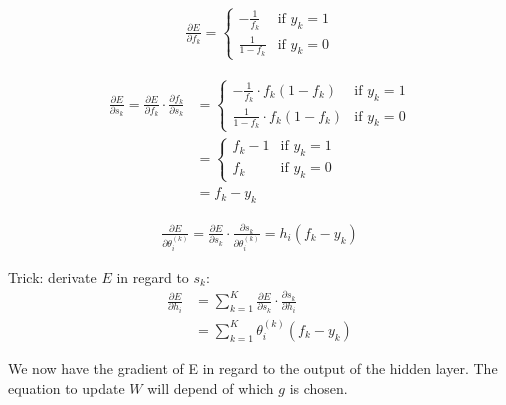 \begin{align}
	\frac{ \partial E } { \partial f_k } = 
		\left\{
		    \begin{array}{ll}
		        - \frac{1}{f_k} & \mbox{if } y_k =1 \\
		        \frac{1}{1 - f_k} & \mbox{if } y_k =0
		    \end{array}
		\right.
\end{align}


\begin{align}
	\frac{ \partial E } { \partial s_k } 
		=  
		\frac{ \partial E } { \partial f_k } \cdot \frac{ \partial f_k } { \partial s_k } 
		&=
		\left\{
		    \begin{array}{ll}
		        - \frac{1}{f_k} \cdot f_k (1 - f_k)& \mbox{if } y_k =1 \\
		        \frac{1}{1 - f_k} \cdot f_k (1 - f_k)& \mbox{if } y_k =0
		    \end{array}
		\right. \\
		&=
		\left\{
		    \begin{array}{ll}
		       f_k - 1 & \mbox{if } y_k =1 \\
		       f_k & \mbox{if } y_k =0
		    \end{array}
		\right. \\
		&= f_k - y_k
\end{align}



\begin{align}
	\frac{\partial E}{\partial \theta_i^{(k)}} 
	= 
	\frac{\partial E}{\partial s_k} \cdot \frac{\partial s_k}{\partial \theta_i^{(k)}} 
	= 
	h_i (f_k - y_k)
\end{align}


Trick: derivate $E$ in regard to $s_k$:
\begin{align}
	\frac{\partial E}{\partial h_i} 
	&= 
	\sum_{k=1}^K \frac{\partial E}{\partial s_k} \cdot \frac{\partial s_k}{\partial h_i} \\
	&= 
	\sum_{k=1}^K \theta_i^{(k)} (f_k - y_k)
\end{align}

We now have the gradient of E in regard to the output of the hidden layer. The equation to update $W$ will depend of which $g$ is chosen.
